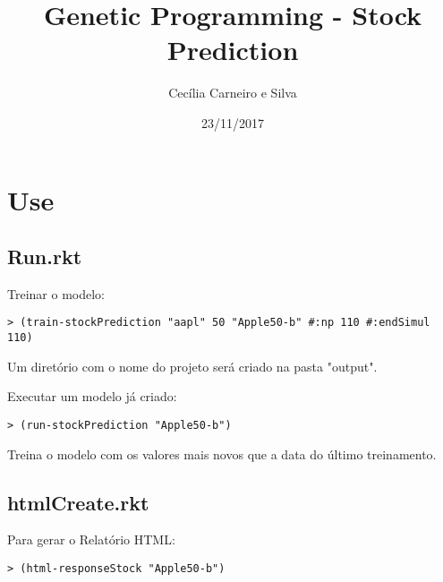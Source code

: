 \documentclass[11pt]{article}
\author{Cecília Carneiro e Silva}
\date{23/11/2017}
\title{Genetic Programming - Stock Prediction}
\begin{document}
\maketitle
\tableofcontents


\section{Use}
\label{sec-1}

\subsection{Run.rkt}
\label{sec-1-1}

Treinar o modelo:

\begin{verbatim}
> (train-stockPrediction "aapl" 50 "Apple50-b" #:np 110 #:endSimul 110)
\end{verbatim}

Um diretório com o nome do projeto será criado na pasta "output".

Executar um modelo já criado:

\begin{verbatim}
> (run-stockPrediction "Apple50-b")
\end{verbatim}

Treina o modelo com os valores mais novos que a data do último treinamento.

\subsection{htmlCreate.rkt}
\label{sec-1-2}

Para gerar o Relatório HTML:

\begin{verbatim}
> (html-responseStock "Apple50-b")
\end{verbatim}
\end{document}
